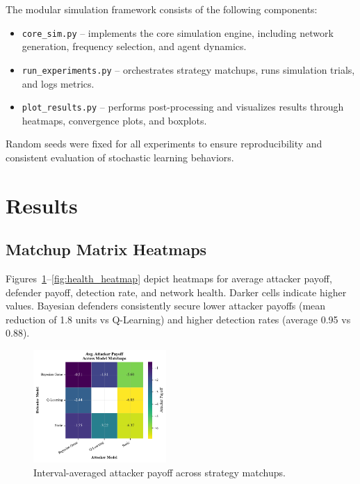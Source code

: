 \documentclass[conference]{IEEEtran}
\begin{document}
The modular simulation framework consists of the following components:
\begin{itemize}
    \item \texttt{core\_sim.py} – implements the core simulation engine, including network generation, frequency selection, and agent dynamics.
    \item \texttt{run\_experiments.py} – orchestrates strategy matchups, runs simulation trials, and logs metrics.
    \item \texttt{plot\_results.py} – performs post-processing and visualizes results through heatmaps, convergence plots, and boxplots.
\end{itemize}

Random seeds were fixed for all experiments to ensure reproducibility and consistent evaluation of stochastic learning behaviors.

\section{Results}

\subsection{Matchup Matrix Heatmaps}
Figures~\ref{fig:atk_payoff_heatmap}--\ref{fig:health_heatmap} depict heatmaps for average attacker payoff, defender payoff, detection rate, and network health. Darker cells indicate higher values. Bayesian defenders consistently secure lower attacker payoffs (mean reduction of 1.8 units vs Q-Learning) and higher detection rates (average 0.95 vs 0.88).

\begin{figure}[htbp]
  \centering
  \includegraphics[width=0.45\textwidth]{fig_atk_payoff_heatmap.pdf}
  \caption{Interval-averaged attacker payoff across strategy matchups.}
  \label{fig:atk_payoff_heatmap}
\end{figure}
\end{document}
